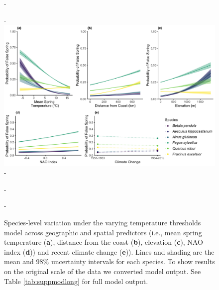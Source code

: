 \documentclass{article}\usepackage[]{graphicx}\usepackage[]{color}
\begin{document}
{\begin{figure} [H]
  -\begin{center}
  -\includegraphics[width=16cm]{..//..//analyses/figures/InteractionPlots/Species_longtemps.png}
  -\caption{Species-level variation under the varying temperature thresholds model across geographic and spatial predictors (i.e., mean spring temperature (\textbf{a}), distance from the coast (\textbf{b}), elevation (\textbf{c}), NAO index (\textbf{d})) and recent climate change (\textbf{e})). Lines and shading are the mean and 98\% uncertainty intervals for each species. To show results on the original scale of the data we converted model output. See Table \ref{tab:suppmodlong} for full model output. }\label{fig:spptemps}
  -\end{center}
  -\end{figure}}
\end{document}
